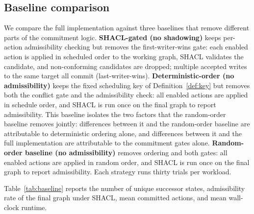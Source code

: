 \documentclass{ieeeaccess}
\theoremstyle{definition}
\theoremstyle{plain}
\theoremstyle{remark}
\begin{document}
\subsection{Baseline comparison}
\label{sec:eval:baseline}

We compare the full implementation against three baselines that remove different parts of the commitment logic. \textbf{SHACL-gated (no shadowing)} keeps per-action admissibility checking but removes the first-writer-wins gate: each enabled action is applied in scheduled order to the working graph, SHACL validates the candidate, and non-conforming candidates are dropped; multiple accepted writes to the same target all commit (last-writer-wins). \textbf{Deterministic-order (no admissibility)} keeps the fixed scheduling key of Definition~\ref{def:key} but removes both the conflict gate and the admissibility check: all enabled actions are applied in schedule order, and SHACL is run once on the final graph to report admissibility. This baseline isolates the two factors that the random-order baseline removes jointly: differences between it and the random-order baseline are attributable to deterministic ordering alone, and differences between it and the full implementation are attributable to the commitment gates alone. \textbf{Random-order baseline (no admissibility)} removes ordering and both gates: all enabled actions are applied in random order, and SHACL is run once on the final graph to report admissibility. Each strategy runs thirty trials per workload.

Table~\ref{tab:baseline} reports the number of unique successor states, admissibility rate of the final graph under SHACL, mean committed actions, and mean wall-clock runtime.
\end{document}
